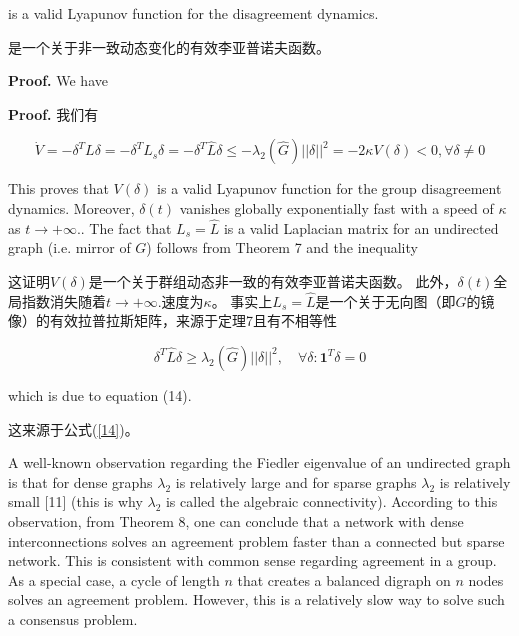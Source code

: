 \documentclass{article}
\begin{document}
{\color[gray]{0.5}
is a valid Lyapunov function for the disagreement dynamics.
}

是一个关于非一致动态变化的有效李亚普诺夫函数。

{\color[gray]{0.5}
\noindent\textbf{Proof.} We have
}

\noindent\textbf{Proof.} 我们有

\begin{equation}
    \tag{29}
    \label{29}
    \dot{V} = -\delta^TL\delta = -\delta^TL_s\delta = -\delta^T\hat{L}\delta \le -\lambda_2(\hat{G})||\delta||^2 = -2\kappa V(\delta) < 0, \forall \delta \ne 0
\end{equation}

{\color[gray]{0.5}
\noindent This proves that $V(\delta)$ is a valid Lyapunov function for the group disagreement dynamics. 
Moreover, $\delta(t)$ vanishes globally exponentially fast with a speed of $\kappa$ as $t\rightarrow +\infty ..$ 
The fact that $L_s = \hat{L}$ is a valid Laplacian matrix for an undirected graph (i.e. mirror of $G$) follows from Theorem 7 and the inequality
}

\noindent 这证明$V(\delta)$是一个关于群组动态非一致的有效李亚普诺夫函数。
此外，$\delta(t)$全局指数消失随着$t\rightarrow +\infty .$速度为$\kappa$。
事实上$L_s = \hat{L}$是一个关于无向图（即$G$的镜像）的有效拉普拉斯矩阵，来源于定理7且有不相等性

\begin{equation}
    \tag{30}
    \label{30}
    \delta^T \hat{L} \delta \ge \lambda_2(\hat{G})||\delta||^2,\quad \forall\delta:\mathbf{1}^T\delta=0
\end{equation}

{\color[gray]{0.5}
\noindent which is due to equation (14).
}

\noindent 这来源于公式(\ref{14})。

{\color[gray]{0.5}
A well-known observation regarding the Fiedler eigenvalue of an undirected graph is that for dense graphs $\lambda_2$ is relatively large and for sparse graphs $\lambda_2$ is relatively small [11] (this is why $\lambda_2$ is called the algebraic connectivity). 
According to this observation, from Theorem 8, one can conclude that a network with dense interconnections solves an agreement problem faster than a connected but sparse network. 
This is consistent with common sense regarding agreement in a group. 
As a special case, a cycle of length $n$ that creates a balanced digraph on $n$ nodes solves an agreement problem. 
However, this is a relatively slow way to solve such a consensus problem.
}
\end{document}
